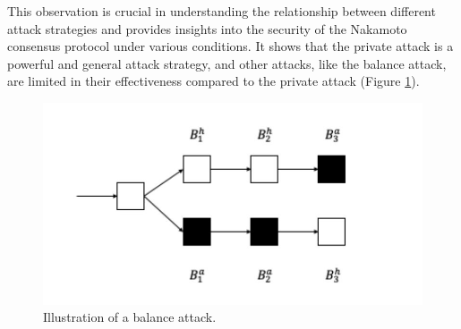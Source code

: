\documentclass{report}
\begin{document}
This observation is crucial in understanding the relationship between different attack strategies and provides insights into the security of the Nakamoto consensus protocol under various conditions. It shows that the private attack is a powerful and general attack strategy, and other attacks, like the balance attack, are limited in their effectiveness compared to the private attack (Figure \ref{fig:f3}). 
\begin{figure}[h!]
	\centering
	\includegraphics[width=0.6\linewidth]{Fig/F3}
	\caption{Illustration of a balance attack.}
	\label{fig:f3}
\end{figure}
\end{document}
